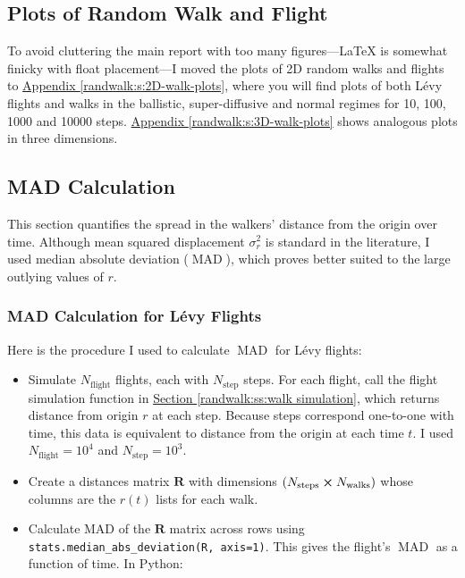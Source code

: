 \documentclass[11pt, a4paper]{article}
\newcommand{\mat}[1]{\mathbf{#1}}
\newcommand{\lev}{L\'evy\xspace}
\newcommand{\mad}{\operatorname{MAD}}
\begin{document}
\subsection{Plots of Random Walk and Flight}
To avoid cluttering the main report with too many figures---\LaTeX{} is somewhat finicky with float placement---I moved the plots of 2D random walks and flights to \hyperref[randwalk:s:2D-walk-plots]{Appendix \ref{randwalk:s:2D-walk-plots}}, where you will find plots of both \lev flights and walks in the ballistic, super-diffusive and normal regimes for 10, 100, 1000 and 10000 steps. \hyperref[randwalk:s:3D-walk-plots]{Appendix \ref{randwalk:s:3D-walk-plots}} shows analogous plots in three dimensions.

\subsection{MAD Calculation} \label{randwalk:ss:MAD-calculation}
This section quantifies the spread in the walkers' distance from the origin over time. Although mean squared displacement $ \sigma_{r}^{2} $ is standard in the literature, I used median absolute deviation ($ \mad $), which proves better suited to the large outlying values of $ r $. 

\subsubsection{MAD Calculation for \lev Flights} \label{randwalk:sss:flight-MAD-explanation}
Here is the procedure I used to calculate $ \mad $ for \lev flights:
\begin{itemize}
	\item Simulate $ N_{\text{flight}} $ flights, each with $ N_{\text{step}} $ steps. For each flight, call the flight simulation function in \hyperref[randwalk:ss:walk simulation]{Section \ref{randwalk:ss:walk simulation}}, which returns distance from origin $ r $ at each step. Because steps correspond one-to-one with time, this data is equivalent to distance from the origin at each time $ t $. I used $ N_{\text{flight}} = 10^{4} $ and $ N_{\text{step}} = 10^{3}$. 
	
	\item Create a distances matrix $ \mat{R} $ with dimensions $ (N_{\text{steps}} \cross N_{\text{walks}}) $ whose columns are the $ r(t) $ lists for each walk.
	
	\item Calculate MAD of the $ \mat{R} $ matrix across rows using \texttt{stats.median\_abs\_deviation(R, axis=1)}. This gives the flight's $ \mad $ as a function of time. In Python:
\end{itemize}
\end{document}
